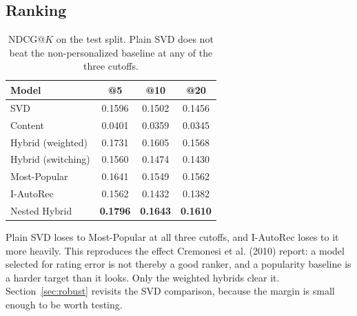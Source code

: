\documentclass[10pt,twocolumn,letterpaper]{article}
\begin{document}
\subsection{Ranking}\label{sec:ranking}
\begin{table}[t]\centering\small
\begin{tabular}{lccc}
\toprule
Model & @5 & @10 & @20 \\
\midrule
SVD                       & 0.1596 & 0.1502 & 0.1456 \\
Content                   & 0.0401 & 0.0359 & 0.0345 \\
Hybrid (weighted)         & 0.1731 & 0.1605 & 0.1568 \\
Hybrid (switching)        & 0.1560 & 0.1474 & 0.1430 \\
Most-Popular              & 0.1641 & 0.1549 & 0.1562 \\
I-AutoRec                 & 0.1562 & 0.1432 & 0.1382 \\
Nested Hybrid             & \textbf{0.1796} & \textbf{0.1643} & \textbf{0.1610} \\
\bottomrule
\end{tabular}
\caption{NDCG@$K$ on the test split. Plain SVD does not beat the
non-personalized baseline at any of the three cutoffs.}
\label{tab:ndcg}
\end{table}

Plain SVD loses to Most-Popular at all three cutoffs, and I-AutoRec loses to
it more heavily. This reproduces the effect Cremonesi et al. (2010) report: a
model selected for rating error is not thereby a good ranker, and a popularity
baseline is a harder target than it looks. Only the weighted hybrids clear it.
Section~\ref{sec:robust} revisits the SVD comparison, because the margin is
small enough to be worth testing.
\end{document}
